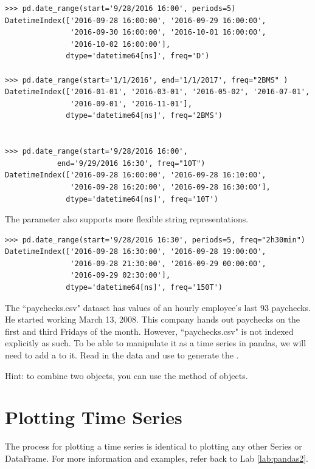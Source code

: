 \begin{lstlisting}
>>> pd.date_range(start='9/28/2016 16:00', periods=5)
DatetimeIndex(['2016-09-28 16:00:00', '2016-09-29 16:00:00',
               '2016-09-30 16:00:00', '2016-10-01 16:00:00',
               '2016-10-02 16:00:00'],
              dtype='datetime64[ns]', freq='D')

>>> pd.date_range(start='1/1/2016', end='1/1/2017', freq="2BMS" )
DatetimeIndex(['2016-01-01', '2016-03-01', '2016-05-02', '2016-07-01',
               '2016-09-01', '2016-11-01'],
              dtype='datetime64[ns]', freq='2BMS')


>>> pd.date_range(start='9/28/2016 16:00',
            end='9/29/2016 16:30', freq="10T")
DatetimeIndex(['2016-09-28 16:00:00', '2016-09-28 16:10:00',
               '2016-09-28 16:20:00', '2016-09-28 16:30:00'],
              dtype='datetime64[ns]', freq='10T')
\end{lstlisting}

The  parameter also supports more flexible string representations.
\begin{lstlisting}
>>> pd.date_range(start='9/28/2016 16:30', periods=5, freq="2h30min")
DatetimeIndex(['2016-09-28 16:30:00', '2016-09-28 19:00:00',
               '2016-09-28 21:30:00', '2016-09-29 00:00:00',
               '2016-09-29 02:30:00'],
              dtype='datetime64[ns]', freq='150T')
\end{lstlisting}

\begin{problem}
The ``paychecks.csv" dataset has values of an hourly employee's last 93 paychecks. He started working March 13, 2008. This company hands out paychecks on the first and third Fridays of the month. However, ``paychecks.csv" is not indexed explicitly as such. To be able to manipulate it as a time series in pandas, we will need to add a  to it. Read in the data and use  to generate the .

Hint: to combine two  objects, you can use the  method of  objects.
\end{problem}

\section*{Plotting Time Series}
The process for plotting a time series is identical to plotting any other Series or DataFrame. For more information and examples, refer back to Lab \ref{lab:pandas2}.

